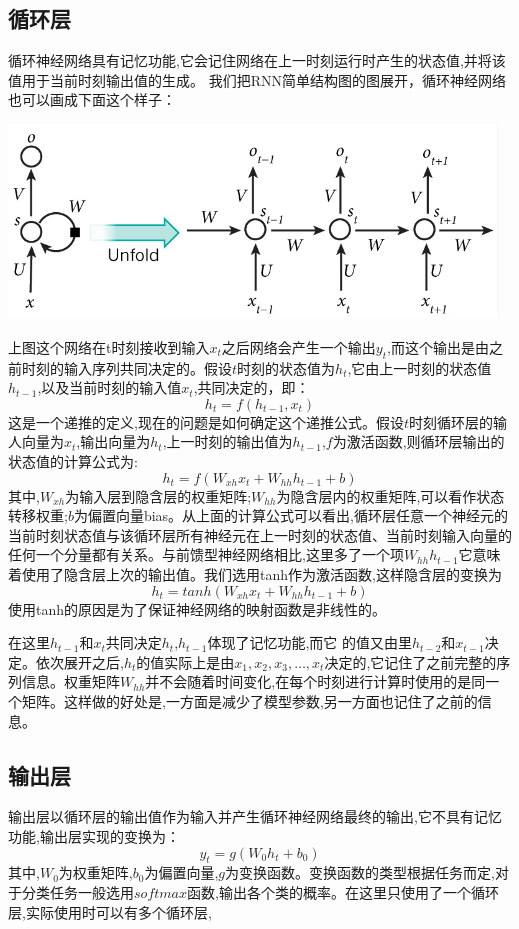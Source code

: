 \documentclass{article}
\begin{document}
\subsection{循环层}
循环神经网络具有记忆功能,它会记住网络在上一时刻运行时产生的状态值,并将该值用于当前时刻输出值的生成。
我们把RNN简单结构图的图展开，循环神经网络也可以画成下面这个样子：\par
\centerline{\includegraphics[width=13cm]{2}}
\par 
上图这个网络在t时刻接收到输入$x_t$之后网络会产生一个输出$y_t$,而这个输出是由之前时刻的输入序列共同决定的。假设$t$时刻的状态值为$h_t$,它由上一时刻的状态值$h_{t-1}$,以及当前时刻的输入值$x_t$,共同决定的，即：
$$h_t=f(h_{t-1},x_t)$$
这是一个递推的定义,现在的问题是如何确定这个递推公式。假设$t$时刻循环层的输人向量为$x_t$,输出向量为$h_t$,上一时刻的输出值为$h_{t-1}$,$f$为激活函数,则循环层输出的状态值的计算公式为:
$$h_t= f(W_{xh}x_t+W_{hh}h_{t-1}+b)$$
其中,$W_{xh}$为输入层到隐含层的权重矩阵;$W_{hh}$为隐含层内的权重矩阵,可以看作状态转移权重;$b$为偏置向量bias。从上面的计算公式可以看出,循环层任意一个神经元的当前时刻状态值与该循环层所有神经元在上一时刻的状态值、当前时刻输入向量的任何一个分量都有关系。与前馈型神经网络相比,这里多了一个项$W_{hh}h_{t-1}$它意味着使用了隐含层上次的输出值。我们选用tanh作为激活函数,这样隐含层的变换为
$$h_t= tanh(W_{xh}x_t+W_{hh}h_{t-1}+b)$$
使用tanh的原因是为了保证神经网络的映射函数是非线性的。\par 
在这里$h_{t-1}$和$x_t$共同决定$h_t$,$h_{t-1}$体现了记忆功能,而它
的值又由里$h_{t-2}$和$x_{t-1}$决定。依次展开之后,$h_t$的值实际上是由$x_1,x_2,x_3,…,x_t$决定的,它记住了之前完整的序列信息。权重矩阵$W_{hh}$并不会随着时间变化,在每个时刻进行计算时使用的是同一个矩阵。这样做的好处是,一方面是减少了模型参数,另一方面也记住了之前的信息。\par 

\subsection{输出层}
输出层以循环层的输出值作为输入并产生循环神经网络最终的输出,它不具有记忆功能,输出层实现的变换为：
$$y_t=g(W_0h_t+b_0)$$
其中,$W_0$为权重矩阵,$b_0$为偏置向量,$g$为变换函数。变换函数的类型根据任务而定,对于分类任务一般选用$softmax$函数,输出各个类的概率。在这里只使用了一个循环层,实际使用时可以有多个循环层,
\end{document}
